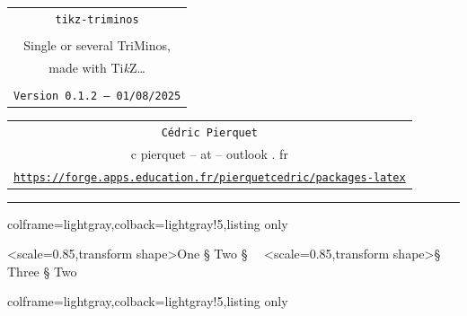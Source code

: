\documentclass[11pt,a4paper]{ltxdoc}
\def\TPversion{0.1.2}
\def\TPdate{01/08/2025}
\begin{document}
\thispagestyle{empty}

\begin{center}
	\begin{minipage}{0.88\linewidth}
		\begin{tcolorbox}[colframe=yellow,colback=yellow!15]
			\begin{center}
				\renewcommand{\arraystretch}{1.25}%
				\begin{tabular}{c}
					{\Huge \texttt{tikz-triminos}}\\
					\\
					{\LARGE Single or several TriMinos,} \\
					{\LARGE made with Ti\textit{k}Z\ldots} \\
					\\
					{\small \texttt{Version \TPversion{} -- \TPdate}}
				\end{tabular}
			\end{center}
		\end{tcolorbox}
	\end{minipage}
\end{center}

\begin{center}
	\begin{tabular}{c}
		\texttt{Cédric Pierquet}\\
		{\ttfamily c pierquet -- at -- outlook . fr}\\
		\texttt{\url{https://forge.apps.education.fr/pierquetcedric/packages-latex}} \\
	\end{tabular}
\end{center}

\hrule

\vfill

\begin{tcblisting}{colframe=lightgray,colback=lightgray!5,listing only}
~~
\end{tcblisting}

\begin{tcolorbox}[colframe=lightgray,colback=lightgray!5]
\hfill\tkztriminos<scale=0.85,transform shape>{One § Two § \faHatWizard}~~\tkztriminos<scale=0.85,transform shape>{\faHatWizard § Three § Two}\hfill~
\end{tcolorbox}


\begin{tcblisting}{colframe=lightgray,colback=lightgray!5,listing only}
\end{tcblisting}
\end{document}
